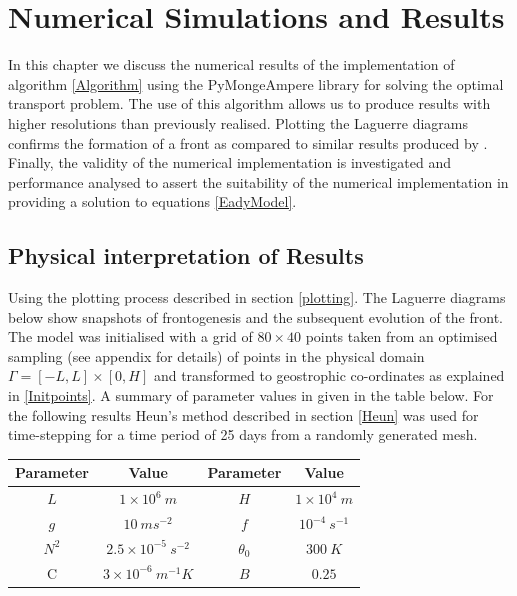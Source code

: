 \chapter{Numerical Simulations and Results \label{results}}
In this chapter we discuss the numerical results of the implementation of algorithm \ref{Algorithm} using the PyMongeAmpere library \cite{Merigot2017a} for solving the optimal transport problem. The use of this algorithm allows us to produce results with higher resolutions than previously realised. Plotting the Laguerre diagrams confirms the formation of a front as compared to similar results produced by \cite{Nakamura1994,Cullen1993}. Finally, the validity of the numerical implementation is investigated and performance analysed to assert the suitability of the numerical implementation in providing a solution to equations \ref{EadyModel}.
\section{Physical interpretation of Results \label{laguerre plots}}
Using the plotting process described in section \ref{plotting}. The Laguerre diagrams below show snapshots of frontogenesis and the subsequent evolution of the front. The model was initialised with a grid of $80 \times 40$ points taken from an optimised sampling (see appendix for details)  of points in the physical domain $\Gamma = [-L,L]\times[0,H]$ and transformed to geostrophic co-ordinates as explained in \ref{Initpoints}. A summary of parameter values in given in the table below.  For the following results Heun's method described in section \ref{Heun} was used for time-stepping for a time period of 25 days from a randomly generated mesh.
\\
\linebreak
\begin{tabular}{|c|c|c|c|}
	\hline 
	Parameter & Value & Parameter & Value \\
	\hline 
	$L$ & $1 \times 10^6 \ m$ & $H$ & $1 \times 10^4 \ m$ \\ 
	\hline 
	$g$ & $10 \ ms^{-2}$ &	$f$ & $10^{-4} \ s^{-1}$ \\ 
	\hline 
	$N^2$ & $2.5 \times10^{-5} \ s^{-2}$&$\theta_0$ & $300 \ K$ \\ 
	\hline 
	C & $3 \times 10^{-6} \ m^{-1}K$ & $B$ & $0.25$ \\ 
	\hline 
	\end{tabular}

